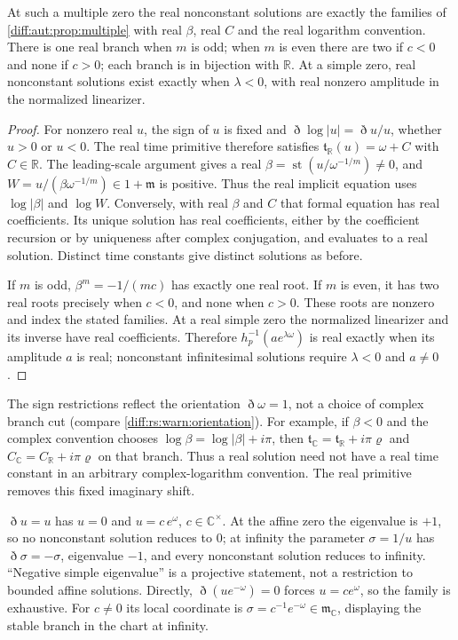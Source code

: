 \documentclass[11pt,letterpaper]{article}
\numberwithin{equation}{section}
\theoremstyle{definition}
\theoremstyle{remark}
\newcommand{\R}{\mathbb R}
\newcommand{\C}{\mathbb C}
\newcommand{\mm}{\mathfrak m}
\newcommand{\st}{\operatorname{st}}
\newcommand{\Dn}{\eth}
\begin{document}
\begin{corollary}
\label{diff:aut:cor:realbranches}
At such a multiple zero the real nonconstant solutions are exactly the families
of \cref{diff:aut:prop:multiple} with real $\beta$, real $C$ and the real logarithm
convention. There is one real branch when $m$ is odd; when $m$ is even there are
two if $c<0$ and none if $c>0$; each branch is in bijection with $\R$. At a simple
zero, real nonconstant solutions exist exactly when $\lambda<0$, with
real nonzero amplitude in the normalized linearizer.
\end{corollary}
\begin{proof}
For nonzero real $u$, the sign of $u$ is fixed and
$\Dn\log|u|=\Dn u/u$, whether $u>0$ or $u<0$.
The real time primitive therefore satisfies
$\mathfrak t_{\R}(u)=\omega+C$ with $C\in\R$.
The leading-scale argument gives a real
$\beta=\st(u/\omega^{-1/m})\neq0$, and
$W=u/(\beta\omega^{-1/m})\in1+\mm$ is positive.
Thus the real implicit equation uses $\log|\beta|$ and $\log W$.
Conversely, with real $\beta$ and $C$ that formal equation has real
coefficients. Its unique solution has real coefficients, either by
the coefficient recursion or by uniqueness after complex conjugation,
and evaluates to a real solution. Distinct time constants give
distinct solutions as before.

If $m$ is odd, $\beta^m=-1/(mc)$ has exactly one real root.
If $m$ is even, it has two real roots precisely when $c<0$,
and none when $c>0$. These roots are nonzero and index the stated
families. At a real simple zero the normalized linearizer and its
inverse have real coefficients. Therefore
$h_p^{-1}(a e^{\lambda\omega})$ is real exactly when its amplitude
$a$ is real; nonconstant infinitesimal solutions require
$\lambda<0$ and $a\neq0$.
\end{proof}

The sign restrictions reflect the orientation $\Dn\omega=1$, not a choice of
complex branch cut (compare \cref{diff:rs:warn:orientation}). For example,
if $\beta<0$ and the complex convention chooses
$\log\beta=\log|\beta|+i\pi$, then
$\mathfrak t_{\C}=\mathfrak t_{\R}+i\pi\varrho$ and
$C_{\C}=C_{\R}+i\pi\varrho$ on that branch. Thus a real solution
need not have a real time constant in an arbitrary complex-logarithm
convention. The real primitive removes this fixed imaginary shift.

\begin{example}
\label{diff:aut:ex:growth}
$\Dn u=u$ has $u=0$ and $u=c\,e^{\omega}$, $c\in\C^{\times}$. At the affine zero the
eigenvalue is $+1$, so no nonconstant solution reduces to $0$; at infinity the
parameter $\sigma=1/u$ has $\Dn\sigma=-\sigma$, eigenvalue $-1$, and every
nonconstant solution reduces to infinity. ``Negative simple eigenvalue'' is a
projective statement, not a restriction to bounded affine solutions.
Directly, $\Dn(u e^{-\omega})=0$ forces $u=c e^\omega$,
so the family is exhaustive. For $c\neq0$ its local coordinate
is $\sigma=c^{-1}e^{-\omega}\in\mm_\C$, displaying the stable
branch in the chart at infinity.
\end{example}
\end{document}
